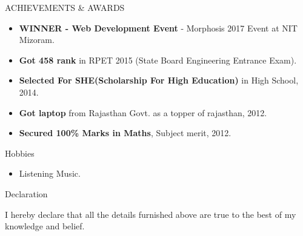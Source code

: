\documentclass{resume} %
\begin{document}
\begin{rSection}{ACHIEVEMENTS \&  AWARDS} \itemsep -2pt   

\begin{itemize}
 \item \textbf{WINNER - Web Development Event} - Morphosis 2017 Event at NIT Mizoram.
 \item \textbf{Got 458 rank } in RPET 2015 (State Board Engineering Entrance Exam).
 \item \textbf{Selected For SHE(Scholarship For High Education)} in High School, 2014.
 \item \textbf{Got laptop} from Rajasthan Govt. as a topper of rajasthan, 2012.
 \item \textbf{Secured 100\% Marks in Maths}, Subject merit, 2012.

\end{itemize}  


\end{rSection} 

\begin{rSection}{ Hobbies  } \itemsep -3pt        
\begin{itemize}
\item Listening Music.
\end{itemize}
\end{rSection}


\begin{rSection}{ Declaration  } \itemsep -3pt        

\item I hereby declare that all the details furnished above are true to the best of my knowledge and belief.   
  
\end{rSection}
\end{document}
